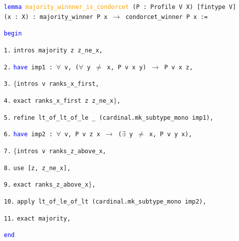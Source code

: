 \documentclass[runningheads]{llncs}
\begin{document}
\begin{itemize}
\item[] \texttt{\textcolor{blue}{lemma} \textcolor{orange}{majority\_winnner\_is\_condorcet} (P : Profile V X) [fintype V] (x : X) : majority\_winner P x $\to$ condorcet\_winner P x :=}

\textcolor{blue}{\texttt{begin}}

\item[\texttt{1.}]\quad  \texttt{intros majority z z\_ne\_x,}
 
 

\item[\texttt{2.}]\quad  \texttt{\textcolor{blue}{have} imp1 : $\forall$ v, ($\forall$ y $\neq$ x, P v x y) $\to$ P v x z,}

\item[\texttt{3.}]\quad\quad  \texttt{$\{$intros v ranks\_x\_first,}

\item[\texttt{4.}]\quad\quad     \texttt{exact ranks\_x\_first z z\_ne\_x$\}$, }
  
\item[\texttt{5.}]\quad  \texttt{refine lt\_of\_lt\_of\_le \_ (cardinal.mk\_subtype\_mono imp1),}
 
\item[\texttt{6.}]\quad  \texttt{\textcolor{blue}{have} imp2 : $\forall$ v, P v z x $\to$ ($\exists$ y $\neq$ x, P v y x),}
 
 \item[\texttt{7.}]\quad \quad    \texttt{$\{$intros v ranks\_z\_above\_x, }
  
 \item[\texttt{8.}]\quad \quad    \texttt{use [z, z\_ne\_x], }
  
 \item[\texttt{9.}]\quad \quad    \texttt{exact ranks\_z\_above\_x$\}$,}
  
 \item[\texttt{10.}]\quad  \texttt{apply lt\_of\_le\_of\_lt (cardinal.mk\_subtype\_mono imp2),}
  
\item[\texttt{11.}]\quad  \texttt{exact majority, }
  
\textcolor{blue}{\texttt{end}}
\end{itemize}
\end{document}
